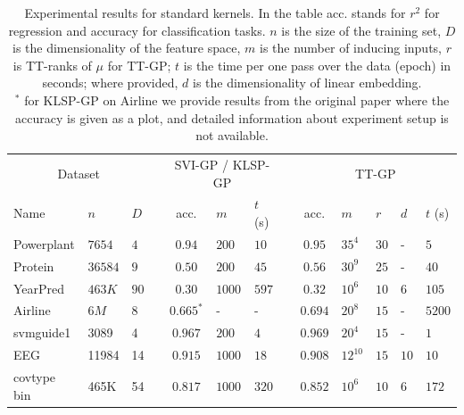 \begin{table}[!t]
  \caption[]{Experimental results for standard kernels. In the table acc. stands for $r^2$ for regression and accuracy
          for classification tasks. $n$ is the size of the
          training set, $D$ is the dimensionality of the feature space,
          $m$ is the number of inducing inputs, $r$ is TT-ranks of $\mu$ for TT-GP; $t$ is the time per one pass over
          the data (epoch) in seconds; where provided, $d$ is the dimensionality of linear embedding.\\
          $^*$ for KLSP-GP on Airline we provide results from the original
          paper where the accuracy is given as a plot, and detailed
          information about experiment setup is not available.
          }
  \label{se_results}
  \centering
  \begin{tabular}{lll l cll l cllll}
    \toprule
    \multicolumn{3}{c}{Dataset} && \multicolumn{3}{c}{SVI-GP / KLSP-GP} && \multicolumn{5}{c}{TT-GP} \\
    \cmidrule{1-3}
    \cmidrule{5-7}
    \cmidrule{9-13}

    Name & $n$ & $D$ &&
    acc. & $m$ & $t$ (s) &&
    acc. & $m$ & $r$ & $d$ & $t$ (s)\\
    \midrule

    Powerplant & $7654$ & $4$ &&
    $0.94$ & $200$ & $10$ &&
    $0.95$ & $35^4$ & $30$ & - & $5$ \\

    Protein & $36584$ & $9$ &&
    $0.50$ & $200$ & $45$ &&
    $0.56$ & $30^9$ & $25$ & - & $40$ \\

    YearPred & $463K$ & $90$ &&
    $0.30$ & $1000$ & $597$ &&
    $0.32$ & $10^6$ & $10$ & $6$ & $105$ \\

    \midrule
    Airline & $6M$ & $8$ &&
    $0.665^*$ & - & - &&
    $0.694$ & $20^8$ & $15$ & - & $5200$ \\

    svmguide1 & 3089 & 4 &&
    $0.967$ & $200$ & $4$ &&
    $0.969$ & $20^4$ & $15$ & - & $1$\\

    EEG & 11984 & 14 &&
    $0.915$ & $1000$ & $18$ &&
    $0.908$ & $12^{10}$ & $15$ & $10$ & $10$\\

    covtype bin & 465K & 54 &&
    $0.817$ & $1000$ & $320$ &&
    $0.852$ & $10^6$ & $10$ & $6$ & $172$\\
    \bottomrule
  \end{tabular}
\end{table}

